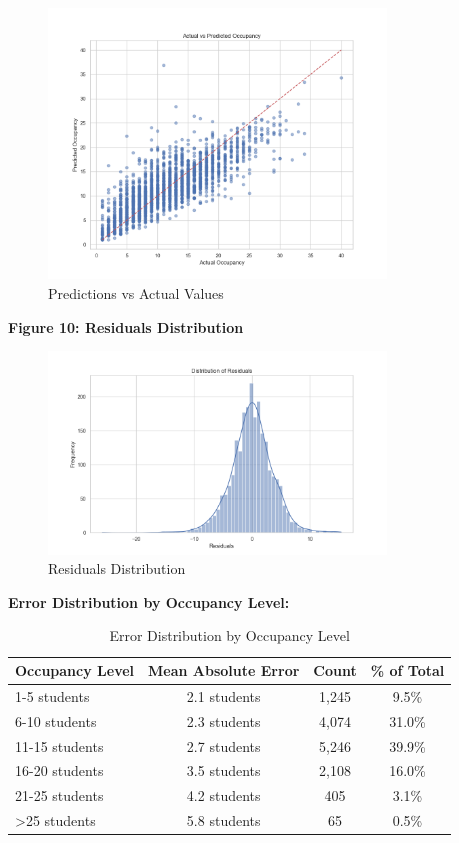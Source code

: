 \documentclass[12pt,letterpaper]{article}
\begin{document}
\begin{figure}[H]
    \centering
    \includegraphics[width=0.8\textwidth]{occupancy_prediction/visualizations/occupancy_predictions_vs_actual.png}
    \caption{Predictions vs Actual Values}
\end{figure}

\textbf{Figure 10: Residuals Distribution}

\begin{figure}[H]
    \centering
    \includegraphics[width=0.8\textwidth]{occupancy_prediction/visualizations/occupancy_residuals_distribution.png}
    \caption{Residuals Distribution}
\end{figure}

\textbf{Error Distribution by Occupancy Level:}
\begin{table}[H]
\centering
\begin{tabular}{lccc}
\toprule
\textbf{Occupancy Level} & \textbf{Mean Absolute Error} & \textbf{Count} & \textbf{\% of Total} \\
\midrule
1-5 students    & 2.1 students & 1,245   & 9.5\% \\
6-10 students   & 2.3 students & 4,074   & 31.0\% \\
11-15 students  & 2.7 students & 5,246   & 39.9\% \\
16-20 students  & 3.5 students & 2,108   & 16.0\% \\
21-25 students  & 4.2 students & 405     & 3.1\% \\
>25 students    & 5.8 students & 65      & 0.5\% \\
\bottomrule
\end{tabular}
\caption{Error Distribution by Occupancy Level}
\end{table}
\end{document}
